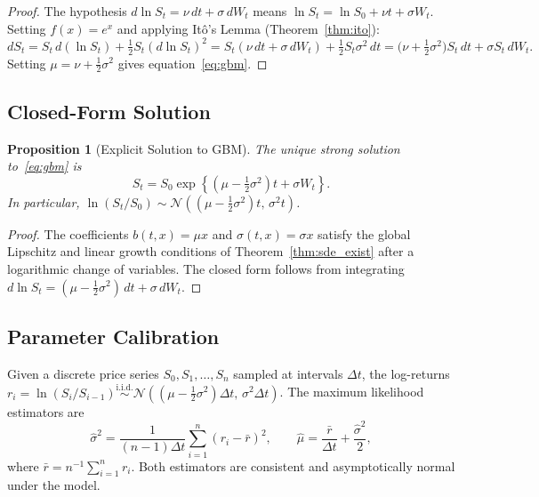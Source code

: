 \documentclass[12pt, a4paper, oneside]{report}
\theoremstyle{plain}
\newtheorem{proposition}[theorem]{Proposition}
\theoremstyle{definition}
\theoremstyle{remark}
\begin{document}
\begin{proof}
The hypothesis $d\ln S_t = \nu\,dt + \sigma\,dW_t$ means
$\ln S_t = \ln S_0 + \nu t + \sigma W_t$.  Setting $f(x) = e^x$ and
applying It\^{o}'s Lemma (Theorem~\ref{thm:ito}):
\[
  dS_t = S_t\,d(\ln S_t) + \tfrac{1}{2}S_t(d\ln S_t)^2
  = S_t(\nu\,dt + \sigma\,dW_t) + \tfrac{1}{2}S_t\sigma^2\,dt
  = \bigl(\nu + \tfrac{1}{2}\sigma^2\bigr)S_t\,dt + \sigma S_t\,dW_t.
\]
Setting $\mu = \nu + \frac{1}{2}\sigma^2$ gives equation~\eqref{eq:gbm}.
\end{proof}

\subsection{Closed-Form Solution}

\begin{proposition}[Explicit Solution to GBM]
\label{prop:gbm_solution}
The unique strong solution to~\eqref{eq:gbm} is
\begin{equation}
\label{eq:gbm_solution}
  S_t = S_0 \exp\!\left\{\!\left(\mu - \tfrac{1}{2}\sigma^2\right)t
  + \sigma W_t\right\}.
\end{equation}
In particular, $\ln(S_t/S_0) \sim \mathcal{N}\!\left((\mu - \frac{1}{2}\sigma^2)t,\, \sigma^2 t\right)$.
\end{proposition}

\begin{proof}
The coefficients $b(t,x) = \mu x$ and $\sigma(t,x) = \sigma x$ satisfy the global
Lipschitz and linear growth conditions of Theorem~\ref{thm:sde_exist} after a
logarithmic change of variables.  The closed form follows from integrating
$d\ln S_t = (\mu - \frac{1}{2}\sigma^2)\,dt + \sigma\,dW_t$.
\end{proof}

\subsection{Parameter Calibration}

Given a discrete price series $S_0, S_1, \ldots, S_n$ sampled at intervals $\Delta t$,
the log-returns
$r_i = \ln(S_i / S_{i-1}) \overset{\text{i.i.d.}}{\sim} \mathcal{N}((\mu - \frac{1}{2}\sigma^2)\Delta t,\, \sigma^2\Delta t)$.
The maximum likelihood estimators are
\begin{equation}
  \hat\sigma^2 = \frac{1}{(n-1)\Delta t}
    \sum_{i=1}^n (r_i - \bar r)^2,
  \qquad
  \hat\mu = \frac{\bar r}{\Delta t} + \frac{\hat\sigma^2}{2},
\end{equation}
where $\bar r = n^{-1}\sum_{i=1}^n r_i$.  Both estimators are consistent and
asymptotically normal under the model.
\end{document}
